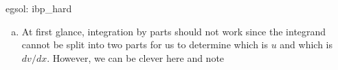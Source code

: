 \begin{egsol}[]{egsol: ibp_hard}
    \begin{enumerate}[a)]
        \item At first glance, integration by parts should not work since the integrand cannot be split into two parts for us to determine which is $u$ and which is $dv/dx$.  However, we can be clever here and note
    \end{enumerate}
\end{egsol}